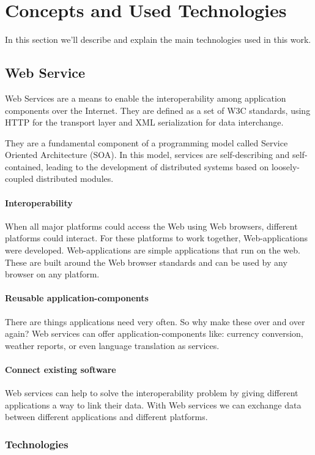 \section{Concepts and Used Technologies}
In this section we'll describe and explain the main technologies used in this work.

\subsection{Web Service}
Web Services are a means to enable the interoperability among application components over the Internet.  They are defined as a set of W3C standards, using HTTP for the transport layer and XML serialization for data interchange.

They are  a fundamental component of a programming model called Service Oriented Architecture (SOA). In this model, services are self-describing and self-contained, leading to the development of distributed systems based on loosely-coupled distributed modules.

\paragraph{Interoperability}
When all major platforms could access the Web using Web browsers, different platforms could interact. For these platforms to work together, Web-applications were developed. Web-applications are simple applications that run on the web. These are built around the Web browser standards and can be used by any browser on any platform.

\paragraph{Reusable application-components}
There are things applications need very often. So why make these over and over again? Web services can offer application-components like: currency conversion, weather reports, or even language translation as services.

\paragraph{Connect existing software}
Web services can help to solve the interoperability problem by giving different applications a way to link their data. With Web services we can exchange data between different applications and different platforms. \citep{WST}

\subsubsection{Technologies}


